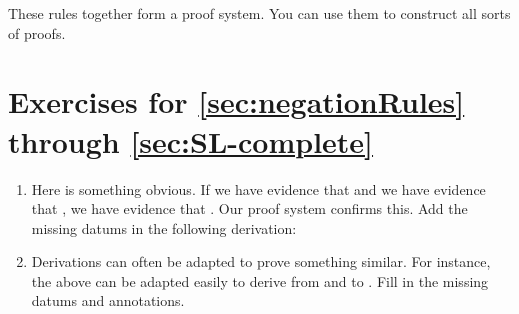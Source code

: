 These rules together form a proof system. You can use them to construct all 
sorts of proofs. 

\section{Exercises for \ref{sec:negationRules} through \ref{sec:SL-complete}}

\begin{enumerate}
\item  Here is something obvious. If we have evidence that  and we 
 have evidence that , we have evidence that . Our proof system 
 confirms this. Add the missing datums in the following derivation:

\begin{argument*}










\end{argument*}



\item Derivations can often be adapted to prove something similar. For instance, 
 the above can be adapted easily to derive from  
 and  to . Fill in the missing 
 datums and annotations.


\begin{argument*}






\end{argument*}
\end{enumerate}
